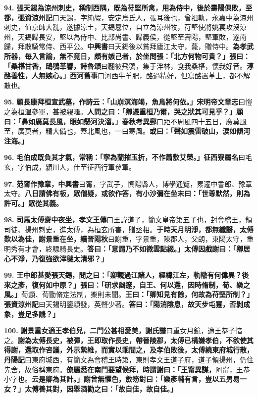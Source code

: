\textbf{94.} \textbf{張天錫為涼州刺史，稱制西隅，既為苻堅所禽，用為侍中，後於壽陽俱敗，至都，}{\footnotesize \textbf{張資涼州記}曰天錫，字純嘏，安定烏氏人，張耳後也，曾祖軌，永嘉中為涼州刺史，值京師大亂，遂據涼土，天錫簒位，自立為涼州牧，苻堅使將姚萇攻沒涼州，天錫歸長安，堅以為侍中、比部尚書、歸義侯，從堅至壽陽，堅軍敗，遂南歸，拜散騎常侍、西平公。\textbf{中興書}曰天錫後以貧拜廬江太守，薨，贈侍中。}\textbf{為孝武所器，毎入言論，無不竟日，頗有嫉己者，於坐問張：「北方何物可貴？」張曰：「桑椹甘香，鴟鴞革響，}{\footnotesize \textbf{詩魯頌}曰翩彼飛鴞，集于泮林，食我桑椹，懷我好音。}\textbf{淳酪養性，人無嫉心。」}{\footnotesize \textbf{西河舊事}曰河西牛羊肥，酪過精好，但寫酪置革上，都不解散也。}

\textbf{95.} \textbf{顧長康拜桓宣武墓，作詩云：「山崩溟海竭，魚鳥將何依。」}{\footnotesize \textbf{宋明帝文章志}曰愷之為桓溫參軍，甚被親暱。}\textbf{人問之曰：「卿憑重桓乃爾，哭之狀其可見乎？」顧曰：「鼻如廣莫長風，眼如懸河決溜。」}{\footnotesize \textbf{春秋考異郵}曰距不周風四十五日，廣莫風至，廣莫者，精大備也，蓋北風也，一曰寒風。}\textbf{或曰：「聲如震雷破山，涙如傾河注海。」}

\textbf{96.} \textbf{毛伯成既負其才氣，常稱：「寧為蘭摧玉折，不作蕭敷艾榮。」}{\footnotesize \textbf{征西寮屬名}曰毛玄，字伯成，潁川人，仕至征西行軍參軍。}

\textbf{97.} \textbf{范甯作豫章，}{\footnotesize \textbf{中興書}曰甯，字武子，慎陽縣人，博學通覽，累遷中書郎、豫章太守。}\textbf{八日請佛有板，眾僧疑，或欲作答，有小沙彌在坐末曰：「世尊默然，則為許可。」眾從其義。}

\textbf{98.} \textbf{司馬太傅齋中夜坐，}{\footnotesize \textbf{孝文王傳}曰王諱道子，簡文皇帝第五子也，封會稽王，領司徒、揚州刺史，進太傅，為桓玄所害，贈丞相。}\textbf{于時天月明淨，都無纖翳，太傅歎以為佳，謝景重在坐，}{\footnotesize \textbf{續晉陽秋}曰謝重，字景重，陳郡人，父朗，東陽太守，重明秀有才會，終驃騎長史。}\textbf{答曰：「意謂乃不如微雲點綴。」太傅因戲謝曰：「卿居心不淨，乃復強欲滓穢太清邪？」}

\textbf{99.} \textbf{王中郎甚愛張天錫，問之曰：「卿觀過江諸人，經緯江左，軌轍有何偉異？後來之彥，復何如中原？」張曰：「研求幽邃，自王、何以還，因時脩制，荀、樂之風。」}{\footnotesize 荀顗、荀勖脩定法制，樂則未聞。}\textbf{王曰：「卿知見有餘，何故為苻堅所制？」}{\footnotesize \textbf{張資涼州記}曰天錫明鑒穎發，英聲少著。}\textbf{答曰：「陽消陰息，故天步屯蹇，否剝成象，豈足多譏？」}

\textbf{100.} \textbf{謝景重女適王孝伯兒，二門公甚相愛美，}{\footnotesize \textbf{謝氏譜}曰重女月鏡，適王恭子愔之。}\textbf{謝為太傅長史，被彈，王即取作長史，帶晉陵郡，太傅已構嫌孝伯，不欲使其得謝，還取作咨議，外示縶維，而實以乖間之，及孝伯敗後，太傅繞東府城行散，}{\footnotesize \textbf{丹陽記}曰東府城西，有簡文為會稽王時第，東則孝文王道子府，道子領揚州，仍住先舍，故俗稱東府。}\textbf{僚屬悉在南門要望候拜，時謂謝曰：「王甯異謀，}{\footnotesize 阿甯，王恭小字也。}\textbf{云是卿為其計。」謝曾無懼色，斂笏對曰：「樂彥輔有言，豈以五男易一女？」太傅善其對，因舉酒勸之曰：「故自佳，故自佳。」}

